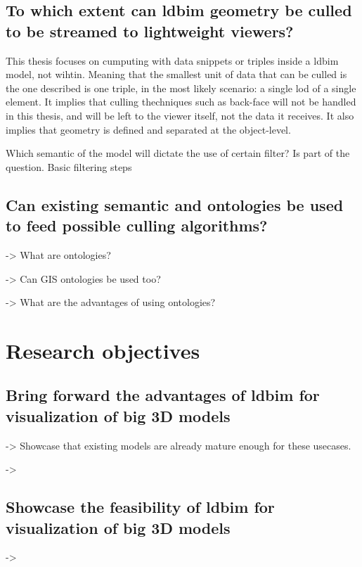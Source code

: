 \subsection[Can \acs{ldbim} be culled?]{To which extent can \acs{ldbim} geometry be culled \\
    to be streamed to lightweight viewers?}
This thesis focuses on cumputing with data snippets or triples inside a \ac{ldbim} model, not wihtin. Meaning that the smallest unit of data that can be culled is the one described is one triple, in the most likely scenario: a single \ac{lod} of a single element. It implies that culling thechniques such as back-face will not be handled in this thesis, and will be left to the viewer itself, not the data it receives. It also implies that geometry is defined and separated at the object-level.

Which semantic of the model will dictate the use of certain filter? Is part of the question. Basic filtering steps 

\subsection[Can existing semantic be used?]{Can existing semantic and ontologies be used\\
    to feed possible culling algorithms?}
-> What are ontologies?

-> Can GIS ontologies be used too?

-> What are the advantages of using ontologies?

\section{Research objectives}
\subsection[Advantages of LDBIM]{Bring forward the advantages of \acs{ldbim} for visualization of big 3D models}
-> Showcase that existing models are already mature enough for these usecases.

->
\subsection[Showcase the feasibility]{Showcase the feasibility of \acs{ldbim} for visualization of big 3D models}
->